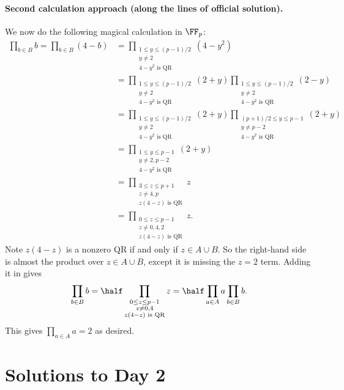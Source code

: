 \documentclass[11pt]{scrartcl}
\begin{document}
\paragraph{Second calculation approach (along the lines of official solution).}
We now do the following magical calculation in $\FF_p$:
\begin{align*}
  \prod_{b \in B} b
  = \prod_{b \in B} (4-b)
  &= \prod_{\substack{1 \le y \le (p-1)/2 \\ y \neq 2 \\ 4-y^2 \text{ is QR}}} (4-y^2) \\
  &= \prod_{\substack{1 \le y \le (p-1)/2 \\ y \neq 2 \\ 4-y^2 \text{ is QR}}} (2+y)
  \prod_{\substack{1 \le y \le (p-1)/2 \\ y \neq 2 \\ 4-y^2 \text{ is QR}}} (2-y) \\
  &= \prod_{\substack{1 \le y \le (p-1)/2 \\ y \neq 2 \\ 4-y^2 \text{ is QR}}} (2+y)
  \prod_{\substack{(p+1)/2 \le y \le p-1 \\ y \neq p-2 \\ 4-y^2 \text{ is QR}}} (2+y) \\
  &= \prod_{\substack{1 \le y \le p-1 \\ y \neq 2, p-2 \\ 4-y^2 \text{ is QR}}} (2+y) \\
  &= \prod_{\substack{3 \le z \le p+1 \\ z \neq 4,p \\ z(4-z) \text{ is QR}}} z \\
  &= \prod_{\substack{0 \le z \le p-1 \\ z \neq 0,4,2 \\ z(4-z) \text{ is QR}}} z.
\end{align*}
Note $z(4-z)$ is a nonzero QR if and only if $z \in A \cup B$.
So the right-hand side is almost the product over $z \in A \cup B$,
except it is missing the $z=2$ term.
Adding it in gives
\[ \prod_{b \in B} b
  = \half \prod_{\substack{0 \le z \le p-1 \\ z \neq 0,4 \\ z(4-z) \text{ is QR}}} z
  = \half \prod_{a \in A} a \prod_{b \in B} b.  \]
This gives $\prod_{a \in A} a = 2$ as desired.
\pagebreak

\section{Solutions to Day 2}
\end{document}
